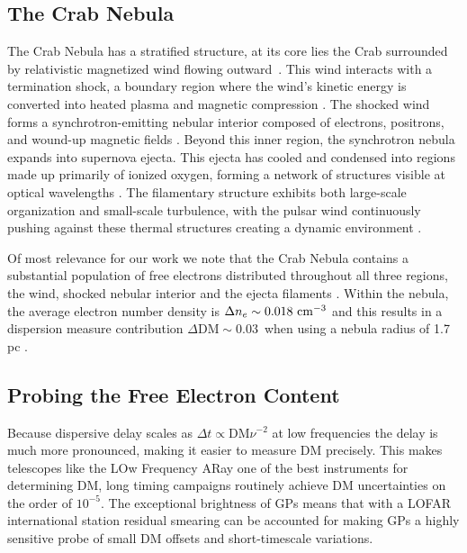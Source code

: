\subsection{The Crab Nebula}
The Crab Nebula has a stratified structure, at its core lies the Crab surrounded by relativistic magnetized wind flowing outward~\citep{lyubarsky_structure_2002}. This wind interacts with a termination shock, a boundary region where the wind's kinetic energy is converted into heated plasma and magnetic compression \citep{lyubarsky_structure_2002, gaensler_evolution_2006}. The shocked wind forms a synchrotron-emitting nebular interior composed of electrons, positrons, and wound-up magnetic fields \citep{hester_crab_2008}. Beyond this inner region, the synchrotron nebula expands into supernova ejecta. This ejecta has cooled and condensed into regions made up primarily of ionized oxygen, forming a network of structures visible at optical wavelengths \citep{hester_crab_2008}. The filamentary structure exhibits both large-scale organization and small-scale turbulence, with the pulsar wind continuously pushing against these thermal structures creating a dynamic environment \citep{hester_crab_2008}.

Of most relevance for our work we note that the Crab Nebula contains a substantial population of free electrons distributed throughout all three regions, the wind, shocked nebular interior and the ejecta filaments \citep{kuzmin_deviation_2008}. Within the nebula, the average electron number density is $\Delta n_e \sim 0.018~\rm{cm}^{-3}$ and this results in a dispersion measure contribution $\Delta \mathrm{DM} \sim 0.03$~\dm when using a nebula radius of 1.7 pc \citep{kuzmin_deviation_2008, mckee_temporal_2018, hester_crab_2008}. 


\subsection{Probing the Free Electron Content}


Because dispersive delay scales as $\Delta t\propto\text{DM}\nu^{-2}$ at low frequencies the delay is much more pronounced, making it easier to measure DM precisely. This makes telescopes like the LOw Frequency ARay \citep[LOFAR;][]{van_haarlem_lofar_2013} one of the best instruments for determining DM, long timing campaigns routinely achieve DM uncertainties on the order of $10^{-5}$\dm \citep{iraci_pulsar_2024}. The exceptional brightness of GPs means that with a LOFAR international station residual smearing can be accounted for making GPs a highly sensitive probe of small DM offsets and short-timescale variations.

